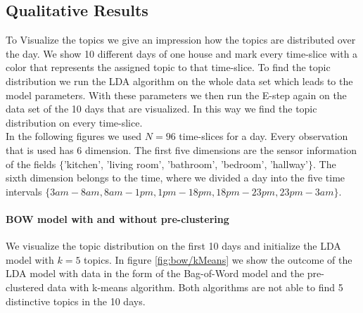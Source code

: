 \documentclass[11pt,a4paper]{article}
\begin{document}
\subsection{Qualitative Results}
To Visualize the topics we give an impression how the topics are distributed over the day. We show 10 different days of one house and mark every time-slice with a color that represents the assigned topic to that time-slice. To find the topic distribution we run the LDA algorithm on the whole data set which leads to the model parameters. With these parameters we then run the E-step again on the data set of the 10 days that are visualized. In this way we find the topic distribution on every time-slice.\\
In the following figures we used $N=96$ time-slices for a day. Every observation that is used has 6 dimension. The first five dimensions are the sensor information of the fields $\{$'kitchen', 'living room', 'bathroom', 'bedroom', 'hallway'$\}$. The sixth dimension belongs to the time, where we divided a day into the five time intervals $\{ 3am - 8am, 8am - 1pm, 1pm - 18pm, 18pm - 23pm, 23pm - 3am  \}$.

\paragraph{BOW model with and without pre-clustering}
We visualize the topic distribution on the first 10 days and initialize the LDA model with $k=5$ topics. In figure \ref{fig:bow/kMeans} we show the outcome of the LDA model with data in the form of the Bag-of-Word model and the pre-clustered data with k-means algorithm. Both algorithms are not able to find 5 distinctive topics in the 10 days.\\
\end{document}
